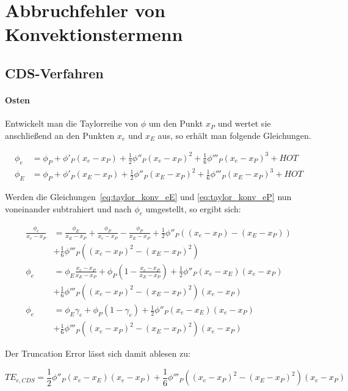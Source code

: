 \section{Abbruchfehler von Konvektionstermenn}

\subsection{CDS-Verfahren}

\paragraph{Osten}
Entwickelt man die Taylorreihe von $\phi$ um den Punkt $x_P$ und wertet sie anschließend
an den Punkten $x_e$ und $x_E$ aus, so erhält man folgende Gleichungen.

\begin{align}
  \phi_e &= \phi_P + \phi'_P(x_e-x_P)+\frac{1}{2}\phi''_P(x_e-x_P)^2
  +\frac{1}{6}\phi'''_P(x_e-x_P)^3+HOT
  \label{eq:taylor_konv_eP}\\
  \phi_E &= \phi_P + \phi'_P(x_E-x_P)+\frac{1}{2}\phi''_P(x_E-x_P)^2
  +\frac{1}{6}\phi'''_P(x_E-x_P)^3+HOT
  \label{eq:taylor_konv_eE}
\end{align}

Werden die Gleichungen~\eqref{eq:taylor_konv_eE} und \eqref{eq:taylor_konv_eP} nun
voneinander subtrahiert und nach $\phi_e$ umgestellt, so ergibt sich:

\begin{align*}
  \frac{\phi_e}{x_e-x_P} &= \frac{\phi_E}{x_E-x_P} + \frac{\phi_P}{x_e-x_P} -
  \frac{\phi_P}{x_E-x_P} + \frac{1}{2} \phi''_P \left({(x_e-x_P)-(x_E-x_P)}\right)\\
  &+ \frac{1}{6} \phi'''_P \left({(x_e-x_P)^2-(x_E-x_P)^2}\right)\\
  \phi_e &= \phi_E \frac{x_e-x_P}{x_E-x_P} + \phi_P \left({1-\frac{x_e-x_P}{x_E-x_P} }\right)
  + \frac{1}{2} \phi''_P (x_e-x_E)(x_e-x_P)\\
  &+ \frac{1}{6} \phi'''_P \left({(x_e-x_P)^2-(x_E-x_P)^2}\right)(x_e-x_P)\\
  \phi_e &= \phi_E \gamma_e + \phi_P (1-\gamma_e)+ \frac{1}{2} \phi''_P (x_e-x_E)(x_e-x_P)\\
         &+ \frac{1}{6} \phi'''_P \left({(x_e-x_P)^2-(x_E-x_P)^2}\right)(x_e-x_P)
\end{align*}

Der Truncation Error lässt sich damit ablesen zu:

\begin{equation*}
  TE_{e, CDS} =  \frac{1}{2} \phi''_P (x_e-x_E)(x_e-x_P)+ \frac{1}{6} \phi'''_P \left({(x_e-x_P)^2-(x_E-x_P)^2}\right)(x_e-x_P)
\end{equation*}


